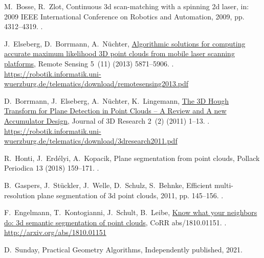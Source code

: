 \documentclass[5p]{elsarticle}
\begin{document}
\begin{thebibliography}{10}
M.~Bosse, R.~Zlot, Continuous 3d scan-matching with a spinning 2d laser, in:
  2009 IEEE International Conference on Robotics and Automation, 2009, pp.
  4312--4319.
\newblock \href {http://dx.doi.org/10.1109/ROBOT.2009.5152851}
  {}.

J.~Elseberg, D.~Borrmann, A.~N{\"u}chter,
  \href{https://robotik.informatik.uni-wuerzburg.de/telematics/download/remotesensing2013.pdf}{{Algorithmic
  solutions for computing accurate maximum likelihood 3D point clouds from
  mobile laser scanning platforms}}, Remote Sensing 5~(11) (2013) 5871--5906.
\newblock \href {http://dx.doi.org/10.3390/rs5115871}
  {}.
\newline\urlprefix\url{https://robotik.informatik.uni-wuerzburg.de/telematics/download/remotesensing2013.pdf}

D.~Borrmann, J.~Elseberg, A.~N{\"u}chter, K.~Lingemann,
  \href{https://robotik.informatik.uni-wuerzburg.de/telematics/download/3dresearch2011.pdf}{{The
  3D Hough Transform for Plane Detection in Point Clouds -- A Review and A new
  Accumulator Design}}, Journal of 3D Research 2~(2) (2011) 1--13.
\newblock \href {http://dx.doi.org/10.1007/3DRes.02(2011)3}
  {}.
\newline\urlprefix\url{https://robotik.informatik.uni-wuerzburg.de/telematics/download/3dresearch2011.pdf}

R.~Honti, J.~Erdélyi, A.~Kopacik, Plane segmentation from point clouds,
  Pollack Periodica 13 (2018) 159--171.
\newblock \href {http://dx.doi.org/10.1556/606.2018.13.2.16}
  {}.

B.~Gaspers, J.~Stückler, J.~Welle, D.~Schulz, S.~Behnke, Efficient
  multi-resolution plane segmentation of 3d point clouds, 2011, pp. 145--156.
\newblock \href {http://dx.doi.org/10.1007/978-3-642-25489-5_15}
  {}.

F.~Engelmann, T.~Kontogianni, J.~Schult, B.~Leibe,
  \href{http://arxiv.org/abs/1810.01151}{Know what your neighbors do: 3d
  semantic segmentation of point clouds}, CoRR abs/1810.01151.
\newblock \href {http://arxiv.org/abs/1810.01151} {}.
\newline\urlprefix\url{http://arxiv.org/abs/1810.01151}

D.~Sunday, {Practical Geometry Algorithms}, Independently published, 2021.


\end{thebibliography}
\end{document}
